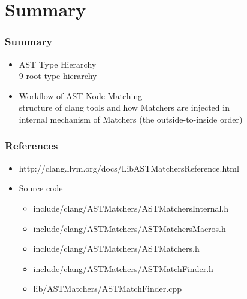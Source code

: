 \documentclass[]{beamer}
\begin{document}


\section{Summary}
\frame{\tableofcontents[currentsection]}

\begin{frame}
  \frametitle{Summary}
  \begin{itemize}
    \item AST Type Hierarchy\\
      9-root type hierarchy
    \item Workflow of AST Node Matching\\
      structure of clang tools and how Matchers are injected in\\
      internal mechanism of Matchers (the outside-to-inside order)
  \end{itemize}
\end{frame}

\begin{frame}
  \frametitle{References}
  \begin{itemize}
    \item http://clang.llvm.org/docs/LibASTMatchersReference.html
    \item Source code
      \begin{itemize}
        \item \alert{include/clang/ASTMatchers/ASTMatchersInternal.h}
        \item include/clang/ASTMatchers/ASTMatchersMacros.h
        \item include/clang/ASTMatchers/ASTMatchers.h
        \item include/clang/ASTMatchers/ASTMatchFinder.h
        \item \alert{lib/ASTMatchers/ASTMatchFinder.cpp}
      \end{itemize}
  \end{itemize}
\end{frame}

\end{document}
